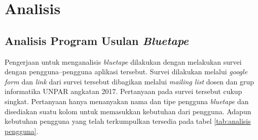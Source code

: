 
\chapter{Analisis}
\section{Analisis Program Usulan \textit{Bluetape}}
Pengerjaan untuk menganalisis \textit{bluetape} dilakukan dengan melakukan survei dengan pengguna--pengguna aplikasi tersebut. Survei dilakukan melalui \textit{google form} dan \textit{link} dari survei tersebut dibagikan melalui \textit{mailing list} dosen dan grup informatika UNPAR angkatan 2017. Pertanyaan pada survei tersebut cukup singkat. Pertanyaan hanya menanyakan nama dan tipe pengguna \textit{bluetape} dan disediakan suatu kolom  untuk memasukkan kebutuhan dari pengguna. Adapun kebutuhan pengguna yang telah terkumpulkan tersedia pada tabel \ref{tab:analisis pengguna}.

